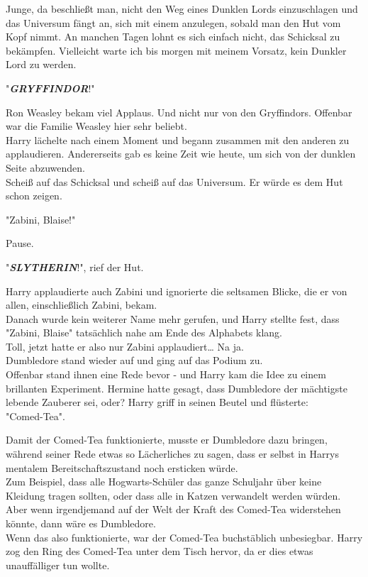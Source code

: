 {Junge, da beschließt man, nicht den Weg eines Dunklen Lords einzuschlagen und das Universum fängt an, sich mit einem anzulegen, sobald man den Hut vom Kopf nimmt. An manchen Tagen lohnt es sich einfach nicht, das Schicksal zu bekämpfen. Vielleicht warte ich bis morgen mit meinem Vorsatz, kein Dunkler Lord zu werden.

"\textbf{\emph{GRYFFINDOR}}!"

Ron Weasley bekam viel Applaus. Und nicht nur von den Gryffindors. Offenbar war die Familie Weasley hier sehr beliebt.\\ Harry lächelte nach einem Moment und begann zusammen mit den anderen zu applaudieren. Andererseits gab es keine Zeit wie heute, um sich von der dunklen Seite abzuwenden.\\ Scheiß auf das Schicksal und scheiß auf das Universum. Er würde es dem Hut schon zeigen.

"Zabini, Blaise!"

Pause.

"\textbf{\emph{SLYTHERIN}}!", rief der Hut.

Harry applaudierte auch Zabini und ignorierte die seltsamen Blicke, die er von allen, einschließlich Zabini, bekam.\\ Danach wurde kein weiterer Name mehr gerufen, und Harry stellte fest, dass\\ "Zabini, Blaise" tatsächlich nahe am Ende des Alphabets klang.\\ Toll, jetzt hatte er also nur Zabini applaudiert… Na ja.\\ Dumbledore stand wieder auf und ging auf das Podium zu.\\ Offenbar stand ihnen eine Rede bevor - und Harry kam die Idee zu einem brillanten Experiment. Hermine hatte gesagt, dass Dumbledore der mächtigste lebende Zauberer sei, oder? Harry griff in seinen Beutel und flüsterte:\\ "Comed-Tea".

Damit der Comed-Tea funktionierte, musste er Dumbledore dazu bringen, während seiner Rede etwas so Lächerliches zu sagen, dass er selbst in Harrys mentalem Bereitschaftszustand noch ersticken würde.\\ Zum Beispiel, dass alle Hogwarts-Schüler das ganze Schuljahr über keine Kleidung tragen sollten, oder dass alle in Katzen verwandelt werden würden.\\ Aber wenn irgendjemand auf der Welt der Kraft des Comed-Tea widerstehen könnte, dann wäre es Dumbledore.\\ Wenn das also funktionierte, war der Comed-Tea buchstäblich unbesiegbar. Harry zog den Ring des Comed-Tea unter dem Tisch hervor, da er dies etwas unauffälliger tun wollte.

}
